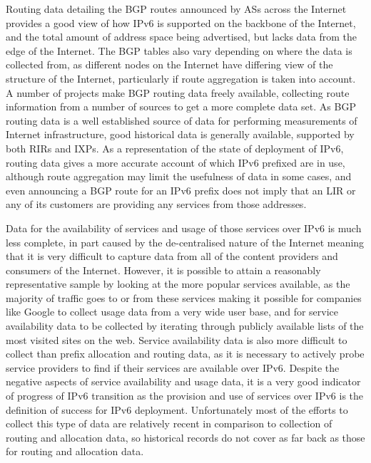 Routing data detailing the BGP routes announced by ASs across the Internet
provides a good view of how IPv6 is supported on the backbone of the Internet,
and the total amount of address space being advertised, but lacks data from the
edge of the Internet. The BGP tables also vary depending on where the data is
collected from, as different nodes on the Internet have differing view of the
structure of the Internet, particularly if route aggregation is taken into
account. A number of projects make BGP routing data freely available, collecting
route information from a number of sources to get a more complete data set. As
BGP routing data is a well established source of data for performing
measurements of Internet infrastructure, good historical data is generally
available, supported by both RIRs and IXPs. As a representation of the state of
deployment of IPv6, routing data gives a more accurate account of which IPv6
prefixed are in use, although route aggregation may limit the usefulness of data
in some cases, and even announcing a BGP route for an IPv6 prefix does not
imply that an LIR or any of its customers are providing any services from those
addresses.

Data for the availability of services and usage of those services over IPv6 is
much less complete, in part caused by the de-centralised nature of the Internet
meaning that it is very difficult to capture data from all of the content
providers and consumers of the Internet. However, it is possible to attain a
reasonably representative sample by looking at the more popular services
available, as the majority of traffic goes to or from these services making it
possible for companies like Google to collect usage data from a very wide user
base, and for service availability data to be collected by iterating through
publicly available lists of the most visited sites on the web. Service
availability data is also more difficult to collect than prefix allocation and
routing data, as it is necessary to actively probe service providers to find if
their services are available over IPv6. Despite the negative aspects of service
availability and usage data, it is a very good indicator of progress of IPv6
transition as the provision and use of services over IPv6 is the definition of
success for IPv6 deployment. Unfortunately most of the efforts to collect this
type of data are relatively recent in comparison to collection of routing and
allocation data, so historical records do not cover as far back as those for
routing and allocation data.

